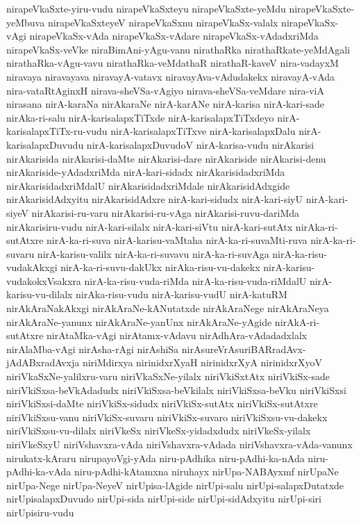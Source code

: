 {nirapeVkaSxte-yiru-vudu
nirapeVkaSxteyu
nirapeVkaSxte-yeMdu
nirapeVkaSxte-yeMbuva
nirapeVkaSxteyeV
nirapeVkaSxnu
nirapeVkaSx-valalx
nirapeVkaSx-vAgi
nirapeVkaSx-vAda
nirapeVkaSx-vAdare
nirapeVkaSx-vAdadxriMda
nirapeVkaSx-veVke
niraBimAni-yAgu-vanu
nirathaRka
nirathaRkate-yeMdAgali
nirathaRka-vAgu-vavu
nirathaRka-veMdathaR
nirathaR-kaveV
nira-vadayxM
niravaya
niravayava
niravayA-vatavx
niravayAva-vAdudakekx
niravayA-vAda
nira-vataRtAginxH
nirava-sheVSa-vAgiyo
nirava-sheVSa-veMdare
nira-viA
nirasana
nirA-karaNa
nirAkaraNe
nirA-karANe
nirA-karisa
nirA-kari-sade
nirAka-ri-salu
nirA-karisalapxTiTxde
nirA-karisalapxTiTxdeyo
nirA-karisalapxTiTx-ru-vudu
nirA-karisalapxTiTxve
nirA-karisalapxDalu
nirA-karisalapxDuvudu
nirA-karisalapxDuvudoV
nirA-karisa-vudu
nirAkarisi
nirAkarisida
nirAkarisi-daMte
nirAkarisi-dare
nirAkariside
nirAkarisi-denu
nirAkariside-yAdadxriMda
nirA-kari-sidadx
nirAkarisidadxriMda
nirAkarisidadxriMdalU
nirAkarisidadxriMdale
nirAkarisidAdxgide
nirAkarisidAdxyitu
nirAkarisidAdxre
nirA-kari-sidudx
nirA-kari-siyU
nirA-kari-siyeV
nirAkarisi-ru-varu
nirAkarisi-ru-vAga
nirAkarisi-ruvu-dariMda
nirAkarisiru-vudu
nirA-kari-silalx
nirA-kari-siVtu
nirA-kari-sutAtx
nirAka-ri-sutAtxre
nirA-ka-ri-suva
nirA-karisu-vaMtaha
nirA-ka-ri-suvaMti-ruva
nirA-ka-ri-suvaru
nirA-karisu-valilx
nirA-ka-ri-suvavu
nirA-ka-ri-suvAga
nirA-ka-risu-vudakAkxgi
nirA-ka-ri-suvu-dakUkx
nirAka-risu-vu-dakekx
nirA-karisu-vudakokxVsakxra
nirA-ka-risu-vuda-riMda
nirA-ka-risu-vuda-riMdalU
nirA-karisu-vu-dilalx
nirAka-risu-vudu
nirA-karisu-vudU
nirA-katuRM
nirAkAraNakAkxgi
nirAkAraNe-kANutatxde
nirAkAraNege
nirAkAraNeya
nirAkAraNe-yanunx
nirAkAraNe-yanUnx
nirAkAraNe-yAgide
nirAkA-ri-sutAtxre
nirAtaMka-vAgi
nirAtamx-vAdavu
nirAdhAra-vAdadadxlalx
nirAlaMba-vAgi
nirAsha-rAgi
nirAshiSa
nirAsureVrAsuriBARradAvx-jAdABxradAvxja
niriMdirxya
nirinidxrXyaH
nirinidxrXyA
nirinidxrXyoV
niriVkaSxNe-yalilxru-varu
niriVkaSxNe-yilalx
niriVkiSxtAtx
niriVkiSx-sade
niriVkiSxsa-beVkAdadudx
niriVkiSxsa-beVkilalx
niriVkiSxsa-beVku
niriVkiSxsi
niriVkiSxsi-daMte
niriVkiSx-sidudx
niriVkiSx-sutAtx
niriVkiSx-sutAtxre
niriVkiSxsu-vanu
niriVkiSx-suvaru
niriVkiSx-suvaro
niriVkiSxsu-vu-dakekx
niriVkiSxsu-vu-dilalx
niriVkeSx
niriVkeSx-yidadxdudx
niriVkeSx-yilalx
niriVkeSxyU
niriVshavxra-vAda
niriVshavxra-vAdada
niriVshavxra-vAda-vanunx
nirukatx-kAraru
nirupayoVgi-yAda
niru-pAdhika
niru-pAdhi-ka-nAda
niru-pAdhi-ka-vAda
niru-pAdhi-kAtamxna
niruhayx
nirUpa-NABAyxmf
nirUpaNe
nirUpa-Nege
nirUpa-NeyeV
nirUpisa-lAgide
nirUpi-salu
nirUpi-salapxDutatxde
nirUpisalapxDuvudo
nirUpi-sida
nirUpi-side
nirUpi-sidAdxyitu
nirUpi-siri
nirUpisiru-vudu
}
